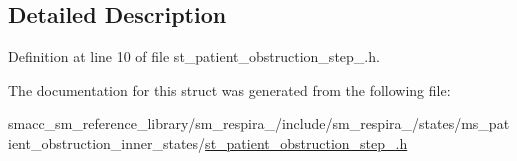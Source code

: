 \subsection{Detailed Description}


Definition at line 10 of file st\+\_\+patient\+\_\+obstruction\+\_\+step\+\_.\+h.



The documentation for this struct was generated from the following file\+:\begin{DoxyCompactItemize}
\item 
smacc\+\_\+sm\+\_\+reference\+\_\+library/sm\+\_\+respira\+\_/include/sm\+\_\+respira\+\_/states/ms\+\_\+patient\+\_\+obstruction\+\_\+inner\+\_\+states/\hyperlink{st__patient__obstruction__step__2_8h}{st\+\_\+patient\+\_\+obstruction\+\_\+step\+\_.\+h}\end{DoxyCompactItemize}
